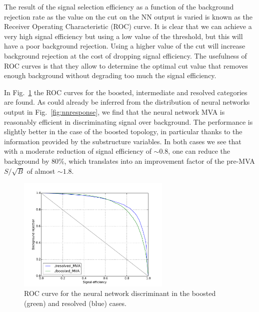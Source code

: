 The result of the signal selection efficiency as a function of the
background rejection rate as the value on the cut on the NN output
is varied is known as the Receiver Operating Characteristic (ROC)
curve.
%
It is clear that we can achieve a very high signal efficiency but using
a low value of the threshold, but this will have a poor background
rejection.
%
Using a higher value of the cut will increase background rejection at the
cost of dropping signal efficiency.
%
The usefulness of ROC curves is that they allow to determine the
optimal cut value that removes enough background without degrading too much the signal efficiency.

In Fig.~\ref{fig:exampleroc} the ROC curves for the
boosted, intermediate and resolved categories are found.
%
As could already be inferred from the distribution of neural
networks output in Fig.~\ref{fig:nnresponse}, we find
that the neural network MVA is reasonably efficient
in discriminating signal over background.
%
The performance is slightly better in the case of the boosted
topology, in particular thanks to the information provided
by the substructure variables.
%
In both cases we see that with a moderate reduction of signal
efficiency of $\sim 0.8$, one can reduce the background by 80\%,
which translates into an improvement factor of the pre-MVA $S/\sqrt{B}$
of almost $\sim 1.8$.



\begin{figure}[t]
\begin{center}
\includegraphics[width=0.65\textwidth]{plots/example_roc.pdf}
\caption{\small ROC curve for the neural network discriminant in the boosted (green) and resolved (blue) cases.}
\label{fig:exampleroc}
\end{center}
\end{figure}

